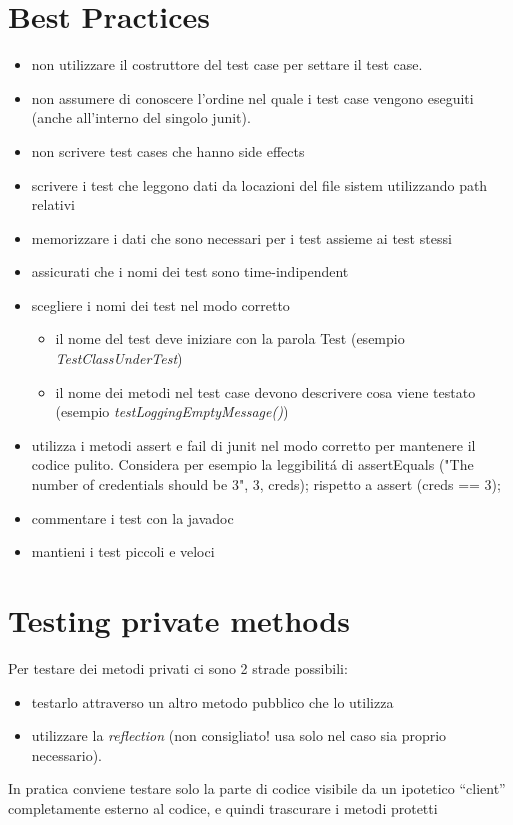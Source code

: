 \documentclass{article}
\begin{document}
\section{Best Practices}
\begin{itemize}
\item non utilizzare il costruttore del test case per settare il test case.
\item non assumere di conoscere l'ordine nel quale i test case vengono eseguiti (anche all'interno del singolo junit).
\item non scrivere test cases che hanno side effects 
\item scrivere i test che leggono dati da locazioni del file sistem utilizzando path relativi
\item memorizzare i dati che sono necessari per i test assieme ai test stessi
\item assicurati che i nomi dei test sono time-indipendent
\item scegliere i nomi dei  test nel modo corretto
\begin{itemize}
\item il nome del test deve iniziare con la parola Test (esempio \emph{TestClassUnderTest})
\item il nome dei metodi nel test case devono descrivere cosa viene testato (esempio \emph{testLoggingEmptyMessage()})
\end{itemize}
\item utilizza i metodi assert e fail di junit nel modo corretto per mantenere il codice pulito. Considera per esempio la leggibilit\' a di assertEquals ("The number of credentials should be 3", 3, creds); rispetto a assert (creds == 3); 
\item commentare i test con la javadoc
\item mantieni i test piccoli e veloci
\end{itemize}

\section{Testing private methods}
Per testare dei metodi privati ci sono 2 strade possibili:
\begin{itemize}
\item testarlo attraverso un altro metodo pubblico che lo utilizza
\item utilizzare la \emph{reflection} (non consigliato! usa solo nel caso sia proprio necessario).
\end{itemize}
In pratica conviene testare solo la parte di codice visibile da un ipotetico “client” completamente esterno al codice, e quindi trascurare i metodi protetti
\end{document}
